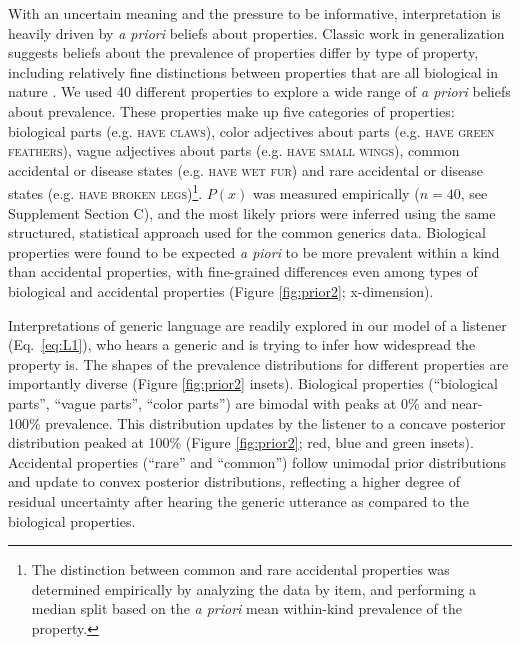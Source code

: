 \documentclass[10pt,letterpaper]{article}
\begin{document}
With an uncertain meaning and the pressure to be informative, interpretation is heavily driven by \emph{a priori} beliefs about properties. 
Classic work in generalization suggests beliefs about the prevalence of properties differ by type of property, including relatively fine distinctions between properties that are all biological in nature \cite{Nisbett1983}. 
We used 40 different properties to explore a wide range of \emph{a priori} beliefs about prevalence. 
These properties make up five categories of properties: biological parts (e.g. \textsc{have claws}), color adjectives about parts (e.g. \textsc{have green feathers}), vague adjectives about parts (e.g. \textsc{have small wings}),  common accidental or disease states (e.g. \textsc{have wet fur}) and rare accidental or disease states (e.g. \textsc{have broken legs})\footnote{The distinction between common and rare accidental properties was determined empirically by analyzing the data by item, and performing a median split based on the \emph{a priori} mean within-kind prevalence of the property.}.
$P(x)$ was measured empirically ($n=40$, see Supplement Section C), and the most likely priors were inferred using the same structured, statistical approach used for the common generics data.
Biological properties were found to be expected \emph{a piori} to be more prevalent within a kind than accidental properties, with fine-grained differences even among types of biological and accidental properties (Figure \ref{fig:prior2}; x-dimension).

Interpretations of generic language are readily explored in our model of a listener (Eq.~\ref{eq:L1}), who hears a generic and is trying to infer how widespread the property is. 
The shapes of the prevalence distributions for different properties are importantly diverse (Figure \ref{fig:prior2} insets). 
Biological properties (``biological parts'', ``vague parts'', ``color parts'') are bimodal with peaks at 0\% and near-100\% prevalence. 
This distribution updates by the listener to a concave posterior distribution peaked at 100\% 
(Figure \ref{fig:prior2}; red, blue and green insets). 
Accidental properties (``rare'' and ``common'') follow unimodal prior distributions and update to convex posterior distributions, reflecting a higher degree of residual uncertainty after hearing the generic utterance as compared to the biological properties. 

\end{document}
